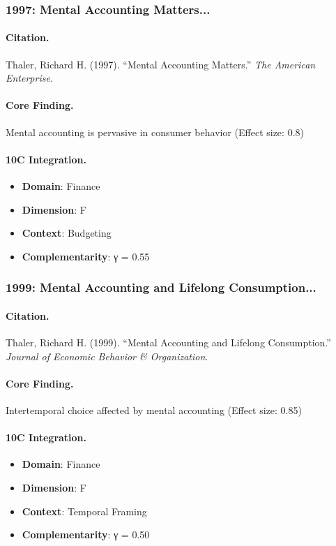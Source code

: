 \subsubsection{1997: Mental Accounting Matters...}

\paragraph{Citation.}
Thaler, Richard H. (1997). ``Mental Accounting Matters.''
\textit{The American Enterprise}.

\paragraph{Core Finding.}
Mental accounting is pervasive in consumer behavior (Effect size: 0.8)

\paragraph{10C Integration.}
\begin{itemize}[nosep]
  \item \textbf{Domain}: Finance
  \item \textbf{Dimension}: F
  \item \textbf{Context}: Budgeting
  \item \textbf{Complementarity}: γ = 0.55
\end{itemize}

\subsubsection{1999: Mental Accounting and Lifelong Consumption...}

\paragraph{Citation.}
Thaler, Richard H. (1999). ``Mental Accounting and Lifelong Consumption.''
\textit{Journal of Economic Behavior & Organization}.

\paragraph{Core Finding.}
Intertemporal choice affected by mental accounting (Effect size: 0.85)

\paragraph{10C Integration.}
\begin{itemize}[nosep]
  \item \textbf{Domain}: Finance
  \item \textbf{Dimension}: F
  \item \textbf{Context}: Temporal Framing
  \item \textbf{Complementarity}: γ = 0.50
\end{itemize}

